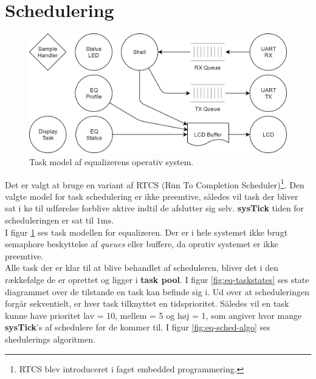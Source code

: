 \section{Schedulering}

\begin{figure}[h!]
	\centering
	\includegraphics[width=.7\textwidth]{billeder/eq-one.png}
	\caption{Task model af equalizerens operativ system.}
	\label{fig:eq-taskmodel}
\end{figure}
Det er valgt at bruge en variant af RTCS (Run To Completion Scheduler)\footnote{RTCS blev introduceret i faget embedded programmering.}. 
Den valgte model for task schedulering er ikke preemtive, således vil task der bliver sat i kø til udførelse forblive aktive indtil de afslutter sig selv.
\textbf{sysTick} tiden for scheduleringen er sat til $1\si{\milli\second}$.\\

I figur \ref{fig:eq-taskmodel} ses task modellen for equalizeren. 
Der er i hele systemet ikke brugt semaphore beskyttelse af \textit{queues} eller buffere, da oprativ systemet er ikke preemtive. \\

Alle task der er klar til at blive behandlet af scheduleren, bliver det i den rækkefølge de er oprettet og ligger i \textbf{task pool}. 
I figur \ref{fig:eq-taskstates} ses state diagrammet over de tilstande en task kan befinde sig i.
Ud over at scheduleringen forgår sekventielt, er hver task tilknyttet en tidsprioritet. 
Således vil en task kunne have prioritet lav = 10, mellem = 5 og høj = 1, som angiver hvor mange \textbf{sysTick}'s af schedulere før de kommer til.
I figur \ref{fig:eq-sched-algo} ses shedulerings algoritmen.

